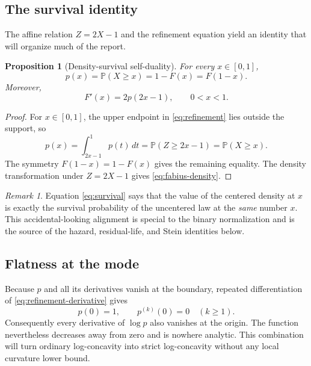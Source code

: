 \documentclass[11pt,oneside]{article}
\newtheorem{proposition}[theorem]{Proposition}
\theoremstyle{definition}
\theoremstyle{remark}
\newtheorem{remark}[theorem]{Remark}
\newcommand{\Prob}{\mathbb P}
\newcommand{\Pp}{\Prob}
\begin{document}
\subsection{The survival identity}
The affine relation $Z=2X-1$ and the refinement equation yield an identity that
will organize much of the report.

\begin{proposition}[Density-survival self-duality]\label{prop:survival}
For every $x\in[0,1]$,
\begin{equation}\label{eq:survival}
 p(x)=\Pp(X\ge x)=1-F(x)=F(1-x).
\end{equation}
Moreover,
\begin{equation}\label{eq:fabius-density}
 F'(x)=2p(2x-1),\qquad 0<x<1.
\end{equation}
\end{proposition}

\begin{proof}
For $x\in[0,1]$, the upper endpoint in \eqref{eq:refinement} lies outside the
support, so
\[
 p(x)=\int_{2x-1}^{1}p(t)\,dt=\Pp(Z\ge2x-1)=\Pp(X\ge x).
\]
The symmetry $F(1-x)=1-F(x)$ gives the remaining equality.  The density
transformation under $Z=2X-1$ gives \eqref{eq:fabius-density}.
\end{proof}

\begin{remark}
Equation \eqref{eq:survival} says that the value of the centered density at $x$
is exactly the survival probability of the uncentered law at the \emph{same}
number $x$.  This accidental-looking alignment is special to the binary
normalization and is the source of the hazard, residual-life, and Stein identities
below.
\end{remark}

\subsection{Flatness at the mode}
Because $p$ and all its derivatives vanish at the boundary, repeated
differentiation of \eqref{eq:refinement-derivative} gives
\begin{equation}\label{eq:flat-mode}
 p(0)=1,
 \qquad p^{(k)}(0)=0\quad(k\ge1).
\end{equation}
Consequently every derivative of $\log p$ also vanishes at the origin.  The
function nevertheless decreases away from zero and is nowhere analytic.  This
combination will turn ordinary log-concavity into strict log-concavity without any
local curvature lower bound.
\end{document}
